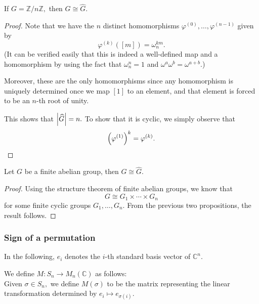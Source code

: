 \begin{prop} \label{prop:ZnZconghatZnZ}
	If $G = \mathbb{Z}/n\mathbb{Z},$ then $G \cong \widehat{G}.$
\end{prop}
\begin{proof} 
	Note that we have the $n$ distinct homomorphisms $\varphi^{(0)}, \ldots, \varphi^{(n-1)}$ given by
	\begin{equation*} 
		\varphi^{(k)}([m]) = \omega_n^{km}.
	\end{equation*}
	(It can be verified easily that this is indeed a well-defined map and a homomorphism by using the fact that $\omega_n^n = 1$ and $\omega^a\omega^b = \omega^{a + b}.$)

	Moreover, these are the only homomorphisms since any homomorphism is uniquely determined once we map $[1]$ to an element, and that element is forced to be an $n$-th root of unity.

	This shows that ${\left\lvert \widehat{G} \right\lvert} = n.$ To show that it is cyclic, we simply observe that
	\begin{equation*} 
		\left(\varphi^{(1)}\right)^k = \varphi^{(k)}. \qedhere
	\end{equation*}
\end{proof}

\begin{cor} \label{cor:GconghatG}
	Let $G$ be a finite abelian group, then $G \cong \widehat{G}.$
\end{cor}
\begin{proof} 
	Using the structure theorem of finite abelian groups, we know that
	\begin{equation*} 
		G \cong G_1 \times \cdots \times G_n
	\end{equation*}
	for some finite cyclic groups $G_1, \ldots, G_n.$ From the previous two propositions, the result follows.
\end{proof}

\subsubsection{Sign of a permutation}

In the following, $e_i$ denotes the $i$-th standard basis vector of $\mathbb{C}^n.$

\begin{defn}
	We define $M:S_n \to M_n(\mathbb{C})$ as follows:\\
	Given $\sigma \in S_n,$ we define $M(\sigma)$ to be the matrix representing the linear transformation determined by $e_i \mapsto e_{\sigma(i)}.$
\end{defn}

